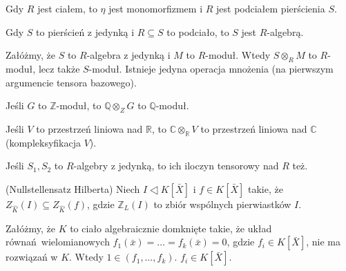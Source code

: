 \documentclass[a4paper, 12pt]{article}
\newcommand{\+}{\enspace}
\begin{document}
Gdy $R$ jest ciałem, to $η$ jest monomorfizmem
i $R$ jest podciałem pierścienia $S$.

Gdy $S$ to pierścień z jedynką i $R⊆S$ to podciało,
to $S$ jest $R$-algebrą.

Załóżmy, że $S$ to $R$-algebra z jedynką i $M$ to $R$-moduł.
Wtedy $S ⊗_R M$ to $R$-moduł, lecz także $S$-moduł.
Istnieje jedyna operacja mnożenia (na pierwszym argumencie tensora bazowego).

Jeśli $G$ to $ℤ$-moduł, to $ℚ ⊗_Z G$ to $ℚ$-moduł.

Jeśli $V$ to przestrzeń liniowa nad $ℝ$,
to $ℂ ⊗_ℝ V$ to przestrzeń liniowa nad $ℂ$ (kompleksyfikacja $V$).

Jeśli $S_1, S_2$ to $R$-algebry z jedynką, to ich iloczyn tensorowy nad $R$ też.

(Nullstellensatz Hilberta)
Niech $I ◁ K[\bar{X}]$ i $f ∈ K[\bar{X}]$ takie, że
$Z_{\hat{K}}(I) ⊆ Z_{\hat{K}}(f)$, gdzie
$ℤ_L(I)$ to zbiór wspólnych pierwiastków $I$.

Załóżmy, że $K$ to ciało algebraicznie domknięte takie, że
układ równań wielomianowych $f_1(\bar{x}) = … = f_k(\bar{x}) = 0$,
gdzie $f_i ∈ K[\bar{X}]$,
nie ma rozwiązań w $K$.
Wtedy $1 ∈ (f_1, …, f_k)$.
$f_i ∈ K[\bar{X}]$.
\end{document}
